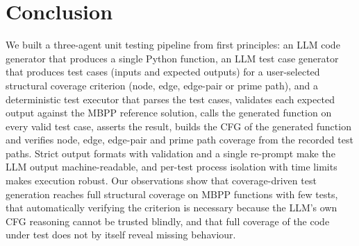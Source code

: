 \documentclass[12pt, a4paper]{article}
\begin{document}
\section{Conclusion}

We built a three-agent unit testing pipeline from first principles: an LLM code generator that produces a single Python function, an LLM test case generator that produces test cases (inputs and expected outputs) for a user-selected structural coverage criterion (node, edge, edge-pair or prime path), and a deterministic test executor that parses the test cases, validates each expected output against the MBPP reference solution, calls the generated function on every valid test case, asserts the result, builds the CFG of the generated function and verifies node, edge, edge-pair and prime path coverage from the recorded test paths. Strict output formats with validation and a single re-prompt make the LLM output machine-readable, and per-test process isolation with time limits makes execution robust. Our observations show that coverage-driven test generation reaches full structural coverage on MBPP functions with few tests, that automatically verifying the criterion is necessary because the LLM's own CFG reasoning cannot be trusted blindly, and that full coverage of the code under test does not by itself reveal missing behaviour.
\end{document}
